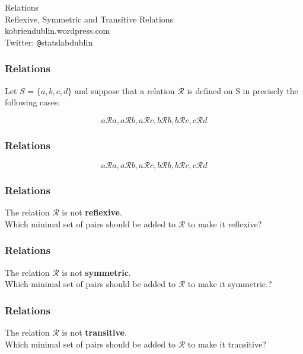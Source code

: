 \documentclass{beamer}
\begin{document}
\begin{frame}
\begin{center}
\Huge
Relations\\
\LARGE
Reflexive, Symmetric and Transitive Relations\\
\bigskip
kobriendublin.wordpress.com\\
Twitter: \texttt{@}statslabdublin


\end{center}
\end{frame}

\begin{frame}
\frametitle{Relations}
\LARGE
\vspace{-2cm}
Let $S$ = $\{ a,b,c,d \}$ and suppose that a relation $\mathcal{R}$ is defined on S in precisely the following cases:

\[ a\mathcal{R}a , a\mathcal{R}b , a\mathcal{R}c , b\mathcal{R}b, b\mathcal{R}c , c\mathcal{R}d  \]

\end{frame}


\begin{frame}
\frametitle{Relations}

\LARGE
\vspace{-5.5cm}
\[ a\mathcal{R}a , a\mathcal{R}b , a\mathcal{R}c , b\mathcal{R}b, b\mathcal{R}c , c\mathcal{R}d  \]

\end{frame}

\begin{frame}
\frametitle{Relations}
\LARGE
\vspace{-2cm}

The relation $\mathcal{R}$ is not \textbf{reflexive}. \\ \bigskip Which minimal set of pairs should be added to  $\mathcal{R}$  to make it reflexive?
\end{frame}
\begin{frame}
\frametitle{Relations}
\LARGE
\vspace{-2cm}

The relation $\mathcal{R}$ is not \textbf{symmetric}. \\\bigskip Which minimal set of pairs should be added to  $\mathcal{R}$  to make it symmetric.?
\end{frame}
\begin{frame}
\frametitle{Relations}
\LARGE
\vspace{-2cm}
The relation $\mathcal{R}$ is not \textbf{transitive}. \\ \bigskip Which minimal set of pairs should be added to  $\mathcal{R}$  to make it transitive?
\end{frame}

\begin{frame}
\end{frame}
\end{document}
